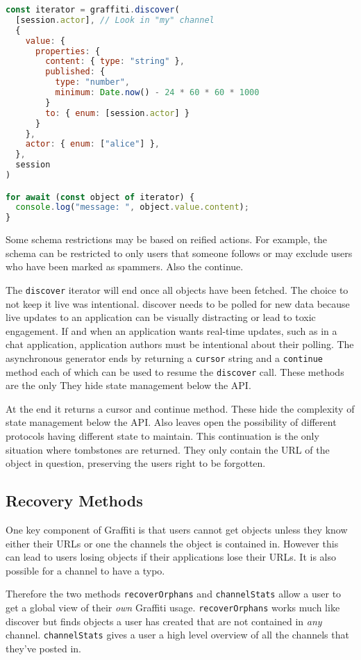 \begin{lstlisting}[language=javascript]
const iterator = graffiti.discover(
  [session.actor], // Look in "my" channel
  {
    value: {
      properties: {
        content: { type: "string" },
        published: {
          type: "number",
          minimum: Date.now() - 24 * 60 * 60 * 1000
        }
        to: { enum: [session.actor] }
      }
    },
    actor: { enum: ["alice"] },
  },
  session
)

for await (const object of iterator) {
  console.log("message: ", object.value.content);
}
\end{lstlisting}

Some schema restrictions may be based on reified actions.
For example, the schema can be restricted to only users
that someone follows or may exclude users who have been
marked as spammers.
Also the continue.

The \texttt{discover} iterator will end once all objects have been fetched.
The choice to not keep it live was intentional.
discover needs to be polled for new data because live updates to an application can be visually distracting or lead to toxic engagement. If and when an application wants real-time updates, such as in a chat application, application authors must be intentional about their polling.
The asynchronous generator ends by returning a \texttt{cursor} string and a
\texttt{continue} method each of which can be used to resume the \texttt{discover}
call.
These methods are the only
They hide state management below the API.

At the end it returns a cursor and continue method.
These hide the complexity of state management below the API.
Also leaves open the possibility of different protocols having different state to maintain.
This continuation is the only situation where tombstones are returned.
They only contain the URL of the object in question, preserving the users right to be forgotten.



\subsection{Recovery Methods}

One key component of Graffiti is that users cannot get objects
unless they know either their URLs or one the channels the object
is contained in.
However this can lead to users losing objects if their applications
lose their URLs. It is also possible for a channel to have a typo.

Therefore the two methods \texttt{recoverOrphans} and \texttt{channelStats}
allow a user to get a global view of their \emph{own} Graffiti usage.
\texttt{recoverOrphans} works much like discover but finds objects
a user has created that are not contained in \emph{any} channel.
\texttt{channelStats} gives a user a high level overview of all the
channels that they've posted in.
